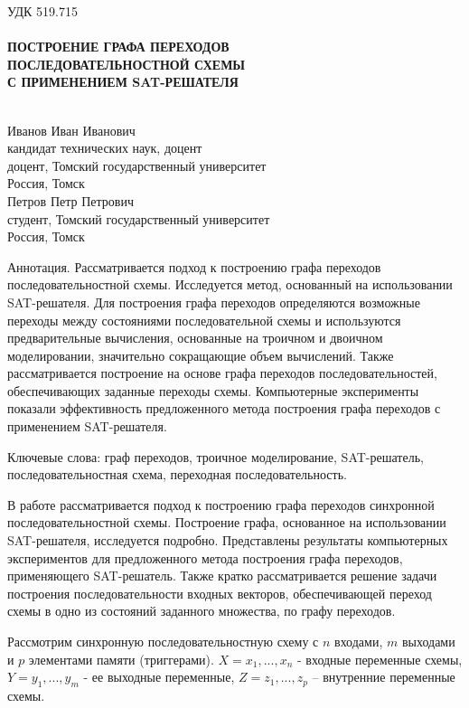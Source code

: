\documentclass[a4paper, 14pt]{article}
\begin{document}
\begin{center}
{\raggedright УДК 519.715\\ \\ \centering\bf ПОСТРОЕНИЕ ГРАФА ПЕРЕХОДОВ\\ 
ПОСЛЕДОВАТЕЛЬНОСТНОЙ СХЕМЫ\\
С ПРИМЕНЕНИЕМ SAT-РЕШАТЕЛЯ}
\\
Иванов Иван Иванович
\\
кандидат технических наук, доцент
\\
доцент, Томский государственный университет
\\
Россия, Томск
\\
Петров Петр Петрович
\\
студент, Томский государственный университет
\\
Россия, Томск
\end{center}

Аннотация. Рассматривается подход к построению графа
переходов последовательностной схемы. Исследуется метод,
основанный на использовании SAT-решателя. Для построения графа
переходов определяются возможные переходы между состояниями
последовательной схемы и используются предварительные
вычисления, основанные на троичном и двоичном моделировании,
значительно сокращающие объем вычислений. Также
рассматривается построение на основе графа переходов
последовательностей, обеспечивающих заданные переходы схемы.
Компьютерные эксперименты показали эффективность
предложенного метода построения графа переходов с применением
SAT-решателя.

Ключевые слова: граф переходов, троичное моделирование,
SAT-решатель, последовательностная схема, переходная
последовательность.
\newline

В работе рассматривается подход к построению графа переходов
синхронной последовательностной схемы. Построение графа,
основанное на использовании SAT-решателя, исследуется подробно.
Представлены результаты компьютерных экспериментов для
предложенного метода построения графа переходов, применяющего
SAT-решатель. Также кратко рассматривается решение задачи
построения последовательности входных векторов, обеспечивающей
переход схемы в одно из состояний заданного множества, по графу
переходов. 


Рассмотрим синхронную последовательностную схему с $n$
входами, $m$ выходами и $p$ элементами памяти (триггерами).
$X = {x_1, ..., x_n}$ - входные переменные схемы, $Y = {y_1, ..., y_m}$ - ее
выходные переменные, $Z = {z_1, ..., z_p}$ – внутренние переменные
схемы.
\end{document}
